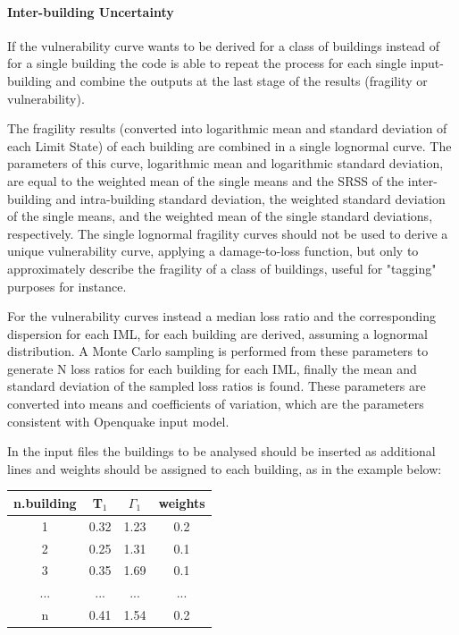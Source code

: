 \paragraph{Inter-building Uncertainty}
If the vulnerability curve wants to be derived for a class of buildings instead of for a single building the code is able to repeat the process for each single input-building and combine the outputs at the last stage of the results (fragility or vulnerability). 

The fragility results (converted into logarithmic mean and standard deviation of each Limit State) of each building are combined in a single lognormal curve. The parameters of this curve, logarithmic mean and logarithmic standard deviation, are equal to the weighted mean of the single means and the SRSS of the inter-building and intra-building standard deviation, the weighted standard deviation of the single means, and the weighted mean of the single standard deviations, respectively.
The single lognormal fragility curves should not be used to derive a unique vulnerability curve, applying a damage-to-loss function, but only to approximately describe the fragility of a class of buildings, useful for "tagging" purposes for instance.

For the vulnerability curves instead a median loss ratio and the corresponding dispersion for each IML, for each building are derived, assuming a lognormal distribution. A Monte Carlo sampling is performed from these parameters to generate N loss ratios for each building for each IML, finally the mean and standard deviation of the sampled loss ratios is found. These parameters are converted into means and coefficients of variation, which are the parameters consistent with Openquake input model.

In the input files the buildings to be analysed should be inserted as additional lines and weights should be assigned to each building, as in the example below:

\begin{table}[H]
\centering
\begin{tabular}{|c|c|c|c|} \hline
\textbf{n.building} & \textbf{T$_1$} & \textbf{$\Gamma_1$} & \textbf{weights} \\ \hline
1 & 0.32 & 1.23 & 0.2\\ \hline
2 & 0.25 & 1.31 & 0.1 \\ \hline
3 & 0.35 & 1.69 & 0.1 \\ \hline
... & ... & ...& ... \\ \hline
n & 0.41 & 1.54 & 0.2\\ \hline
\end{tabular}
\end{table}

